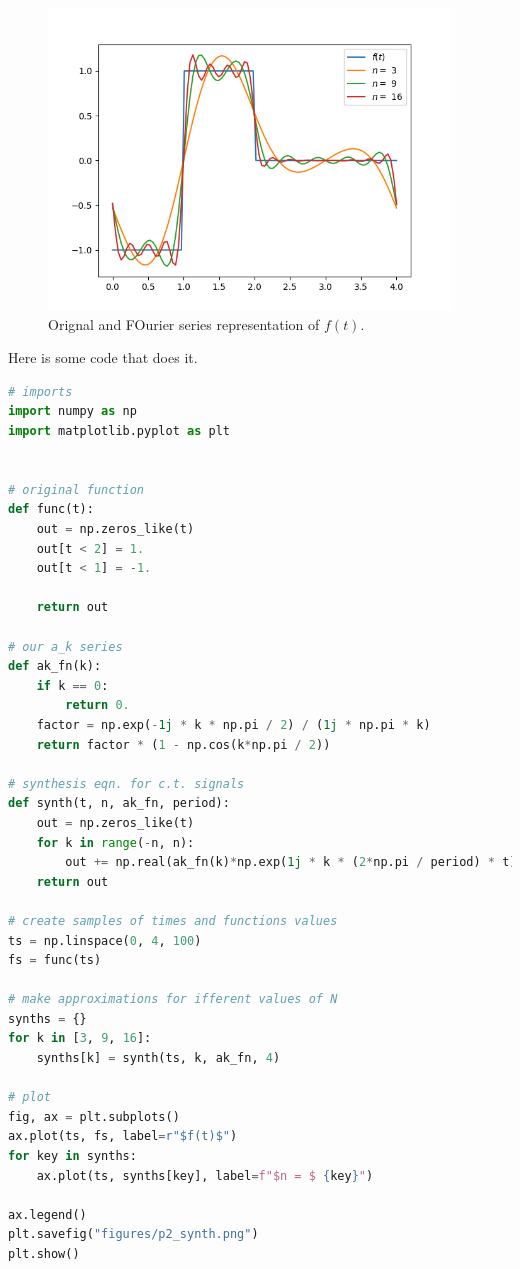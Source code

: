 \begin{figure}[h!]
    \begin{center}
        \includegraphics[width=0.95\textwidth]{figures/p2_synth.png}
    \end{center}
    \caption{Orignal and FOurier series representation of $f(t)$.}
\end{figure}
\clearpage

Here is some code that does it.

\begin{lstlisting}[language=python]
# imports
import numpy as np
import matplotlib.pyplot as plt


# original function
def func(t):
    out = np.zeros_like(t)
    out[t < 2] = 1.
    out[t < 1] = -1.

    return out

# our a_k series
def ak_fn(k):
    if k == 0:
        return 0.
    factor = np.exp(-1j * k * np.pi / 2) / (1j * np.pi * k)
    return factor * (1 - np.cos(k*np.pi / 2))

# synthesis eqn. for c.t. signals
def synth(t, n, ak_fn, period):
    out = np.zeros_like(t)
    for k in range(-n, n):
        out += np.real(ak_fn(k)*np.exp(1j * k * (2*np.pi / period) * t))
    return out

# create samples of times and functions values
ts = np.linspace(0, 4, 100)
fs = func(ts)

# make approximations for ifferent values of N
synths = {}
for k in [3, 9, 16]:
    synths[k] = synth(ts, k, ak_fn, 4)

# plot
fig, ax = plt.subplots()
ax.plot(ts, fs, label=r"$f(t)$")
for key in synths:
    ax.plot(ts, synths[key], label=f"$n = $ {key}")

ax.legend()
plt.savefig("figures/p2_synth.png")
plt.show()
\end{lstlisting}
